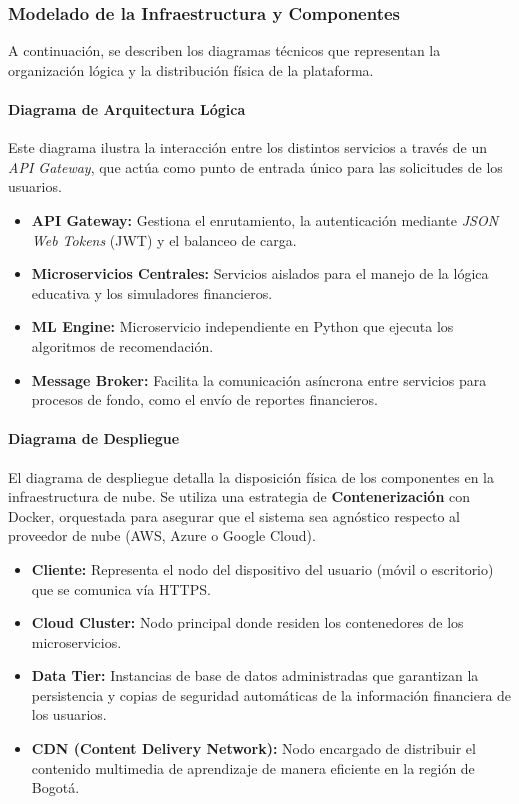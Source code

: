 \subsubsection*{Modelado de la Infraestructura y Componentes}

A continuación, se describen los diagramas técnicos que representan la organización lógica y la distribución física de la plataforma.

\paragraph*{Diagrama de Arquitectura Lógica}
Este diagrama ilustra la interacción entre los distintos servicios a través de un \textit{API Gateway}, que actúa como punto de entrada único para las solicitudes de los usuarios.



\begin{itemize}
	\item \textbf{API Gateway:} Gestiona el enrutamiento, la autenticación mediante \textit{JSON Web Tokens} (JWT) y el balanceo de carga.
	\item \textbf{Microservicios Centrales:} Servicios aislados para el manejo de la lógica educativa y los simuladores financieros.
	\item \textbf{ML Engine:} Microservicio independiente en Python que ejecuta los algoritmos de recomendación.
	\item \textbf{Message Broker:} Facilita la comunicación asíncrona entre servicios para procesos de fondo, como el envío de reportes financieros.
\end{itemize}

\paragraph*{Diagrama de Despliegue}
El diagrama de despliegue detalla la disposición física de los componentes en la infraestructura de nube. Se utiliza una estrategia de \textbf{Contenerización} con Docker, orquestada para asegurar que el sistema sea agnóstico respecto al proveedor de nube (AWS, Azure o Google Cloud).



\begin{itemize}
	\item \textbf{Cliente:} Representa el nodo del dispositivo del usuario (móvil o escritorio) que se comunica vía HTTPS.
	\item \textbf{Cloud Cluster:} Nodo principal donde residen los contenedores de los microservicios.
	\item \textbf{Data Tier:} Instancias de base de datos administradas que garantizan la persistencia y copias de seguridad automáticas de la información financiera de los usuarios.
	\item \textbf{CDN (Content Delivery Network):} Nodo encargado de distribuir el contenido multimedia de aprendizaje de manera eficiente en la región de Bogotá.
\end{itemize}

